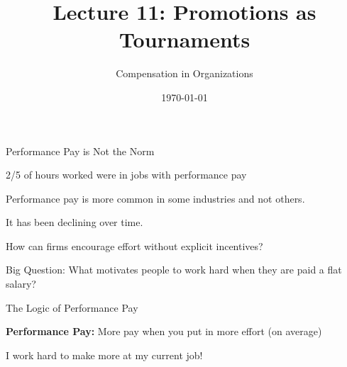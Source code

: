 \documentclass[aspectratio=169,usenames,dvipsnames]{beamer}
\title[diss]{Lecture 11: Promotions as Tournaments} %
\author{Compensation in Organizations} %
\institute[shortinst]{Jacob Kohlhepp}
\date{\today} %
\newenvironment{wideitemize}{\itemize\addtolength{\itemsep}{10pt}}{\enditemize}
\begin{document}
\begin{frame}
\titlepage %

\end{frame}


\begin{frame}{Performance Pay is Not the Norm}

\begin{wideitemize}
    \item 2/5 of hours worked were in jobs with performance pay 
    \item Performance pay is more common in some industries and not others.
    \item It has been declining over time.
    \item How can firms encourage effort without explicit incentives?
\end{wideitemize}
    
\end{frame}


\begin{frame}
\centering
    \huge Big Question:  What motivates people to work hard when they are paid a flat salary?
\end{frame}

\begin{frame}{The Logic of Performance Pay}
\begin{wideitemize}
    \item \textbf{Performance Pay:} More pay when you put in more effort (on average)
    \begin{wideitemize}
        \item I work hard to make more at my current job!
    \end{wideitemize}
\end{wideitemize}

\end{frame}
\end{document}
